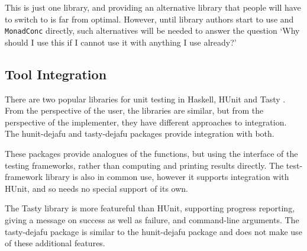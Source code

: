 This is just one library, and providing an alternative library that
people will have to switch to is far from optimal.  However, until
library authors start to use \dejafu{} and \verb|MonadConc| directly,
such alternatives will be needed to answer the question `Why should I
use this if I cannot use it with anything I use already?'

\subsection{Tool Integration}

There are two popular libraries for unit testing in Haskell,
HUnit \parencite{hunit} and Tasty \parencite{tasty}.  From the perspective of the
user, the libraries are similar, but from the perspective of the
implementer, they have different approaches to integration.  The
hunit-dejafu \parencite{hunit_dejafu} and tasty-dejafu \parencite{tasty_dejafu}
packages provide integration with both.

These packages provide analogues of the \dejafu{} functions, but using
the interface of the testing frameworks, rather than computing and
printing results directly.  The test-framework \parencite{test_framework}
library is also in common use, however it supports integration with
HUnit, and so needs no special support of its own.

The Tasty library is more featureful than HUnit, supporting progress
reporting, giving a message on success as well as failure, and
command-line arguments.  The tasty-dejafu package is similar to the
hunit-dejafu package and does not make use of these additional
features.



